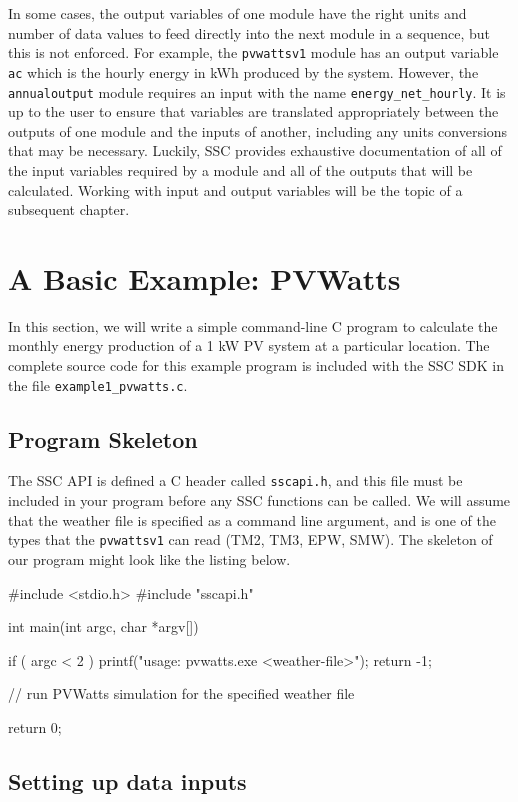 \documentclass{article}
\begin{document}
In some cases, the output variables of one module have the right units and number of data values to feed directly into the next module in a sequence, but this is not enforced.  For example, the \texttt{pvwattsv1} module has an output variable \texttt{ac} which is the hourly energy in kWh produced by the system.   However, the \texttt{annualoutput} module requires an input with the name \texttt{energy\_net\_hourly}.  It is up to the user to ensure that variables are translated appropriately between the outputs of one module and the inputs of another, including any units conversions that may be necessary.  Luckily, SSC provides exhaustive documentation of all of the input variables required by a module and all of the outputs that will be calculated.  Working with input and output variables will be the topic of a subsequent chapter.

\section{A Basic Example: PVWatts}

In this section, we will write a simple command-line C program to calculate the monthly energy production of a 1 kW PV system at a particular location.  The complete source code for this example program is included with the SSC SDK in the file \texttt{example1\_pvwatts.c}.

\subsection{Program Skeleton}

The SSC API is defined a C header called \texttt{sscapi.h}, and this file must be included in your program before any SSC functions can be called.  We will assume that the weather file is specified as a command line argument, and is one of the types that the \texttt{pvwattsv1} can read (TM2, TM3, EPW, SMW).  The skeleton of our program might look like the listing below.

\begin{verbatimtab}[4]
#include <stdio.h>
#include "sscapi.h"

int main(int argc, char *argv[])
{
	if ( argc < 2 )
	{
		printf("usage: pvwatts.exe <weather-file>\n");
		return -1;
	}
 
	// run PVWatts simulation for the specified weather file
	
	return 0;
}
\end{verbatimtab}

\subsection{Setting up data inputs}
\end{document}
